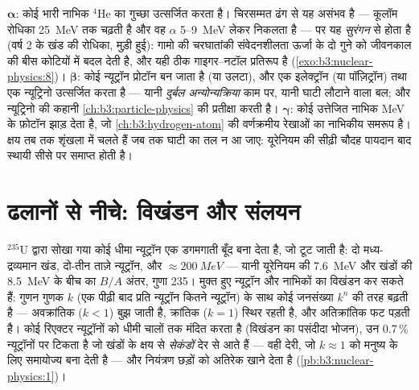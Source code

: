\begin{remark}[नाभिक से बाहर के तीन दरवाज़े]\label{rem:b3:nuclear-physics:modes}
$\boldsymbol\alpha$: कोई भारी नाभिक $^4$He का गुच्छा उत्सर्जित करता
है। चिरसम्मत ढंग से यह असंभव है --- कूलॉम रोधिका \qty{25}{MeV} तक
चढ़ती है और वह $\alpha$ \qty{5}{}--\qty{9}{MeV} लेकर निकलता है ---
पर यह \emph{सुरंगन} से होता है (वर्ष 2 के खंड की रोधिका, मुड़ी हुई):
गामो की चरघातांकी संवेदनशीलता ऊर्जा के दो गुने को जीवनकाल की बीस
कोटियों में बदल देती है, और यही ठीक गाइगर--नटॉल
प्रतिरूप है (\cref{exo:b3:nuclear-physics:8})।
$\boldsymbol\beta$: कोई न्यूट्रॉन प्रोटॉन बन जाता है (या उलटा), और
एक इलेक्ट्रॉन (या पॉज़िट्रॉन) तथा एक न्यूट्रिनो उत्सर्जित करता है ---
यानी \emph{दुर्बल अन्योन्यक्रिया} काम पर, यानी घाटी लौटाने वाला बल;
और न्यूट्रिनो की कहानी \cref{ch:b3:particle-physics} की प्रतीक्षा
करती है।
$\boldsymbol\gamma$: कोई उत्तेजित नाभिक \unit{MeV} के फ़ोटॉन झाड़ देता
है, जो \cref{ch:b3:hydrogen-atom} की वर्णक्रमीय रेखाओं का नाभिकीय
समरूप है। क्षय तब तक शृंखला में चलते हैं जब तक घाटी का तल न आ जाए:
यूरेनियम की सीढ़ी चौदह पायदान बाद स्थायी सीसे पर समाप्त होती है।
\end{remark}

\section{ढलानों से नीचे: विखंडन और संलयन}

\begin{proposition}[विखंडन और शृंखला अभिक्रिया]\label{prop:b3:nuclear-physics:fission}
$^{235}$U द्वारा सोखा गया कोई धीमा न्यूट्रॉन एक डगमगाती बूँद बना देता
है, जो टूट जाती है: दो मध्य-द्रव्यमान खंड, दो-तीन ताज़े न्यूट्रॉन, और
$\approx\qty{200}{MeV}$ --- यानी यूरेनियम की \qty{7.6}{MeV} और खंडों
की \qty{8.5}{MeV} के बीच का $B/A$ अंतर, गुणा 235।
मुक्त हुए न्यूट्रॉन और नाभिकों का विखंडन कर सकते हैं: गुणन गुणक
$k$ (एक पीढ़ी बाद प्रति न्यूट्रॉन कितने न्यूट्रॉन) के साथ कोई
जनसंख्या $k^n$ की तरह बढ़ती है --- अवक्रांतिक ($k < 1$) बुझ जाती है,
क्रांतिक ($k = 1$) स्थिर रहती है, और अतिक्रांतिक फट पड़ती है।
कोई रिएक्टर न्यूट्रॉनों को धीमी चालों तक मंदित करता है (विखंडन का
पसंदीदा भोजन), उन 0.7\,\% न्यूट्रॉनों पर टिकता है जो खंडों के क्षय से
\emph{सेकंडों} देर से आते हैं --- वही देरी, जो $k \approx 1$ को
मनुष्य के लिए समायोज्य बना देती है --- और नियंत्रण छड़ों को अतिरेक
खाने देता है (\cref{pb:b3:nuclear-physics:1})।
\end{proposition}
\admitted

